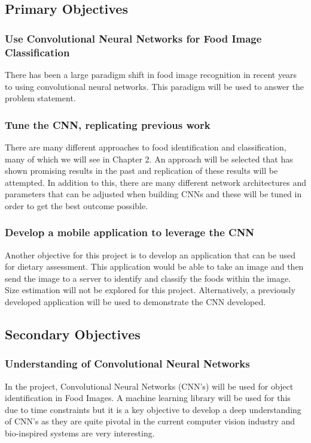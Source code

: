 \subsection*{Primary Objectives}
\subsubsection*{Use Convolutional Neural Networks for Food Image Classification}
There has been a large paradigm shift in food image recognition in recent years to using convolutional neural networks. This paradigm will be used to answer the problem statement.

\subsubsection*{Tune the CNN, replicating previous work}
There are many different approaches to food identification and classification,
many of which we will see in Chapter 2. An approach will be selected that has
shown promising results in the past and replication of these results will be attempted. In addition to this, there are many different network architectures and parameters that can be adjusted when building CNNs and these will be tuned in order to get the best outcome possible.

\subsubsection*{Develop a mobile application to leverage the CNN}
Another objective for this project is to develop an application that can be used
for dietary assessment. This application would be able to take an image and then send the image to a server to identify and classify the foods within the image. Size estimation will not be explored for this project. Alternatively, a previously developed application will be used to demonstrate the CNN developed.

\subsection*{Secondary Objectives}
\subsubsection*{Understanding of Convolutional Neural Networks}
In the project, Convolutional Neural Networks (CNN's) will be used for object identification in Food Images.
A machine learning library will be used for this due to time constraints but it is a key
objective to develop a deep understanding of CNN's as they are quite pivotal in the current computer vision industry and bio-inspired systems are very interesting.

